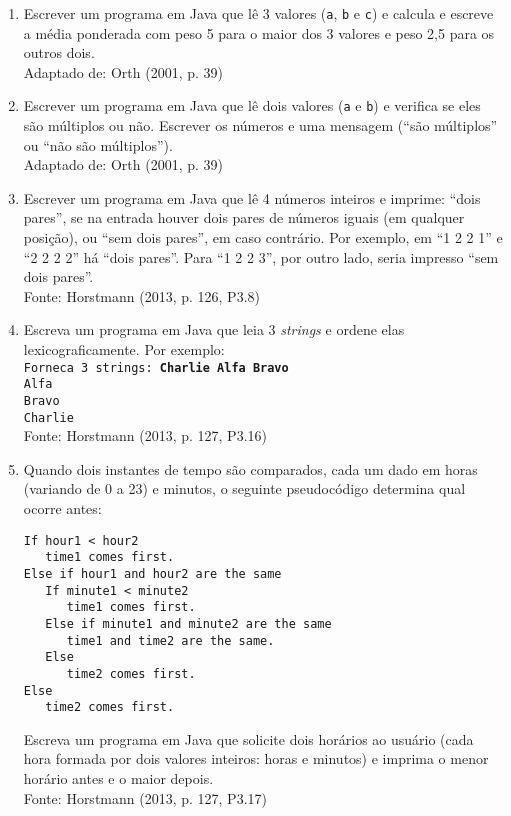 \documentclass[onecolumn,a4paper,10pt]{report}
\newcommand{\+}{\, + \,}
\newcommand{\<}{\hspace*{-0.4cm}}
\begin{document}
\begin{enumerate}[1.]
\item Escrever um programa em Java que lê 3 valores (\texttt{a}, \texttt{b} e \texttt{c}) e calcula e escreve
a média ponderada com peso 5 para o maior dos 3 valores e peso 2,5 para os outros dois.\\
{\tiny Adaptado de: Orth (2001, p. 39)}

\item Escrever um programa em Java que lê dois valores (\texttt{a} e \texttt{b}) e verifica se eles são múltiplos ou não.
Escrever os números e uma mensagem (``são múltiplos'' ou ``não são múltiplos'').\\
{\tiny Adaptado de: Orth (2001, p. 39)}

\item Escrever um programa em Java que lê 4 números inteiros e imprime: ``dois pares'', se na entrada houver dois pares
de números iguais (em qualquer posição), ou ``sem dois pares'', em caso contrário. Por exemplo, em ``1 2 2 1'' e ``2 2 2 2'' há ``dois pares''.
Para ``1 2 2 3'', por outro lado, seria impresso ``sem dois pares''.\\
{\tiny Fonte: Horstmann (2013, p. 126, P3.8)}

\item Escreva um programa em Java que leia 3 \emph{strings} e ordene elas lexicograficamente. Por exemplo:\\
\texttt{Forneca 3 strings: \textbf{Charlie Alfa Bravo}\\
Alfa\\
Bravo\\
Charlie}\\
{\tiny Fonte: Horstmann (2013, p. 127, P3.16)}

\item Quando dois instantes de tempo são comparados, cada um dado em horas (variando de 0 a 23) e minutos, o seguinte pseudocódigo determina qual ocorre antes:
\begin{verbatim}
If hour1 < hour2
   time1 comes first.
Else if hour1 and hour2 are the same
   If minute1 < minute2
      time1 comes first.
   Else if minute1 and minute2 are the same
      time1 and time2 are the same.
   Else
      time2 comes first.
Else
   time2 comes first.
\end{verbatim}
Escreva um programa em Java que solicite dois horários ao usuário (cada hora formada por dois valores inteiros: horas e minutos) e imprima o menor horário antes e o maior depois.\\
{\tiny Fonte: Horstmann (2013, p. 127, P3.17)}


\end{enumerate}
\end{document}
